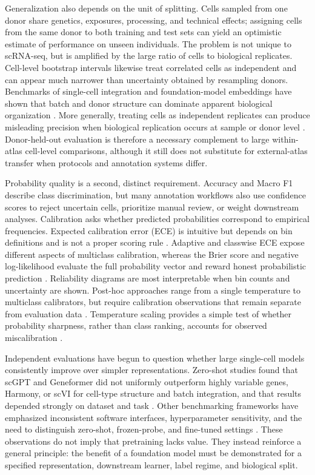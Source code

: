 Generalization also depends on the unit of splitting. Cells sampled from one donor share genetics, exposures, processing, and technical effects; assigning cells from the same donor to both training and test sets can yield an optimistic estimate of performance on unseen individuals. The problem is not unique to scRNA-seq, but is amplified by the large ratio of cells to biological replicates. Cell-level bootstrap intervals likewise treat correlated cells as independent and can appear much narrower than uncertainty obtained by resampling donors. Benchmarks of single-cell integration and foundation-model embeddings have shown that batch and donor structure can dominate apparent biological organization \citep{Luecken2022,Kedzierska2025}. More generally, treating cells as independent replicates can produce misleading precision when biological replication occurs at sample or donor level \citep{Squair2021}. Donor-held-out evaluation is therefore a necessary complement to large within-atlas cell-level comparisons, although it still does not substitute for external-atlas transfer when protocols and annotation systems differ.

Probability quality is a second, distinct requirement. Accuracy and Macro F1 describe class discrimination, but many annotation workflows also use confidence scores to reject uncertain cells, prioritize manual review, or weight downstream analyses. Calibration asks whether predicted probabilities correspond to empirical frequencies. Expected calibration error (ECE) is intuitive but depends on bin definitions and is not a proper scoring rule \citep{Guo2017,Vaicenavicius2019,SilvaFilho2023}. Adaptive and classwise ECE expose different aspects of multiclass calibration, whereas the Brier score and negative log-likelihood evaluate the full probability vector and reward honest probabilistic prediction \citep{Gneiting2007,Nixon2019}. Reliability diagrams are most interpretable when bin counts and uncertainty are shown. Post-hoc approaches range from a single temperature to multiclass calibrators, but require calibration observations that remain separate from evaluation data \citep{Kull2019,VanCalster2019}. Temperature scaling provides a simple test of whether probability sharpness, rather than class ranking, accounts for observed miscalibration \citep{Guo2017}.

Independent evaluations have begun to question whether large single-cell models consistently improve over simpler representations. Zero-shot studies found that scGPT and Geneformer did not uniformly outperform highly variable genes, Harmony, or scVI for cell-type structure and batch integration, and that results depended strongly on dataset and task \citep{Kedzierska2025}. Other benchmarking frameworks have emphasized inconsistent software interfaces, hyperparameter sensitivity, and the need to distinguish zero-shot, frozen-probe, and fine-tuned settings \citep{Boiarsky2023,BioLLM2025,ScEval2026}. These observations do not imply that pretraining lacks value. They instead reinforce a general principle: the benefit of a foundation model must be demonstrated for a specified representation, downstream learner, label regime, and biological split.

